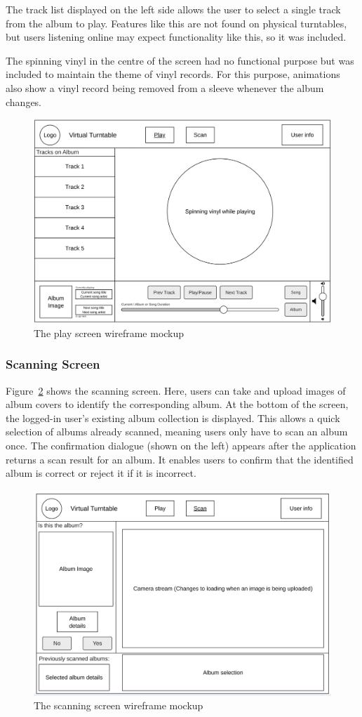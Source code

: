 The track list displayed on the left side allows the user to select a single track from the album to play. Features like this are not found on physical turntables, but users listening online may expect functionality like this, so it was included.

The spinning vinyl in the centre of the screen had no functional purpose but was included to maintain the theme of vinyl records. For this purpose, animations also show a vinyl record being removed from a sleeve whenever the album changes.
\begin{figure} [H]
    \centering
    \includegraphics[width=0.6\linewidth]{figures/play_screen_mockup.png}
    \caption{The play screen wireframe mockup}
    \label{fig:play_screen_mockup}
\end{figure}

\subsubsection{Scanning Screen}
Figure~\ref{fig:scan_screen_mockup} shows the scanning screen. Here, users can take and upload images of album covers to identify the corresponding album.
At the bottom of the screen, the logged-in user’s existing album collection is displayed. This allows a quick selection of albums already scanned, meaning users only have to scan an album once.
The confirmation dialogue (shown on the left) appears after the application returns a scan result for an album. It enables users to confirm that the identified album is correct or reject it if it is incorrect.

\begin{figure} [H]
    \centering
    \includegraphics[width=0.6\linewidth]{figures/scan_screen_mockup.png}
    \caption{The scanning screen wireframe mockup}
    \label{fig:scan_screen_mockup}
\end{figure}


